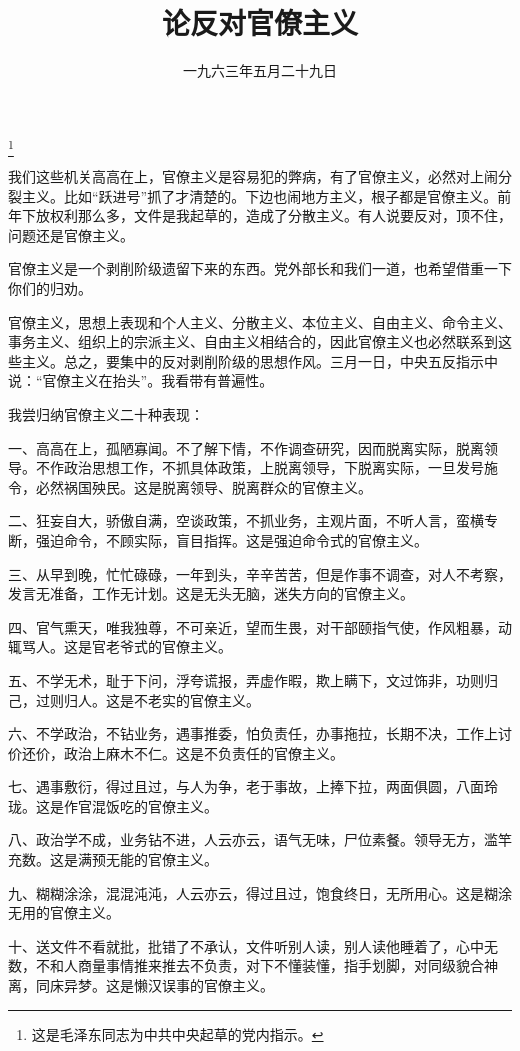 
\title{论反对官僚主义}
\date{一九六三年五月二十九日}
\thanks{这是毛泽东同志为中共中央起草的党内指示。}
\maketitle


我们这些机关高高在上，官僚主义是容易犯的弊病，有了官僚主义，必然对上闹分裂主义。比如“跃进号”抓了才清楚的。下边也闹地方主义，根子都是官僚主义。前年下放权利那么多，文件是我起草的，造成了分散主义。有人说要反对，顶不住，问题还是官僚主义。

官僚主义是一个剥削阶级遗留下来的东西。党外部长和我们一道，也希望借重一下你们的归劝。

官僚主义，思想上表现和个人主义、分散主义、本位主义、自由主义、命令主义、事务主义、组织上的宗派主义、自由主义相结合的，因此官僚主义也必然联系到这些主义。总之，要集中的反对剥削阶级的思想作风。三月一日，中央五反指示中说：“官僚主义在抬头”。我看带有普遍性。

我尝归纳官僚主义二十种表现：

一、高高在上，孤陋寡闻。不了解下情，不作调查研究，因而脱离实际，脱离领导。不作政治思想工作，不抓具体政策，上脱离领导，下脱离实际，一旦发号施令，必然祸国殃民。这是脱离领导、脱离群众的官僚主义。

二、狂妄自大，骄傲自满，空谈政策，不抓业务，主观片面，不听人言，蛮横专断，强迫命令，不顾实际，盲目指挥。这是强迫命令式的官僚主义。

三、从早到晚，忙忙碌碌，一年到头，辛辛苦苦，但是作事不调查，对人不考察，发言无准备，工作无计划。这是无头无脑，迷失方向的官僚主义。

四、官气熏天，唯我独尊，不可亲近，望而生畏，对干部颐指气使，作风粗暴，动辄骂人。这是官老爷式的官僚主义。

五、不学无术，耻于下问，浮夸谎报，弄虚作暇，欺上瞒下，文过饰非，功则归己，过则归人。这是不老实的官僚主义。

六、不学政治，不钻业务，遇事推委，怕负责任，办事拖拉，长期不决，工作上讨价还价，政治上麻木不仁。这是不负责任的官僚主义。

七、遇事敷衍，得过且过，与人为争，老于事故，上捧下拉，两面俱圆，八面玲珑。这是作官混饭吃的官僚主义。

八、政治学不成，业务钻不进，人云亦云，语气无味，尸位素餐。领导无方，滥竿充数。这是满预无能的官僚主义。

九、糊糊涂涂，混混沌沌，人云亦云，得过且过，饱食终日，无所用心。这是糊涂无用的官僚主义。

十、送文件不看就批，批错了不承认，文件听别人读，别人读他睡着了，心中无数，不和人商量事情推来推去不负责，对下不懂装懂，指手划脚，对同级貌合神离，同床异梦。这是懒汉误事的官僚主义。

